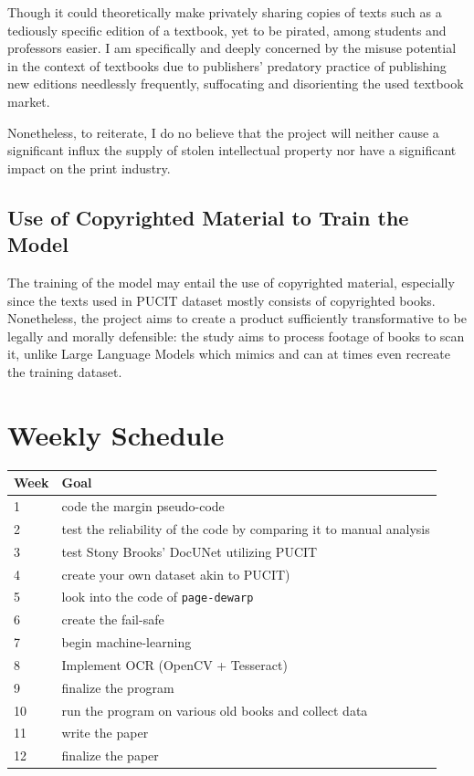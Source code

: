 \documentclass[10pt,twocolumn]{article}
\begin{document}
Though it could theoretically make privately sharing copies of texts such as a tediously specific edition of a textbook, yet to be pirated, among students and professors easier. I am specifically and deeply concerned by the misuse potential in the context of textbooks due to publishers' predatory practice of publishing new editions needlessly frequently, suffocating and disorienting the used textbook market. \newline

Nonetheless, to reiterate, I do no believe that the project will neither cause a significant influx the supply of stolen intellectual property nor have a significant impact on the print industry.  \newline

\subsection{Use of Copyrighted Material to Train the Model}
The training of the model may entail the use of copyrighted material, especially since the texts used in PUCIT dataset mostly consists of copyrighted books. Nonetheless, the project aims to create a product sufficiently transformative to be legally and morally defensible: the study aims to process footage of books to scan it, unlike Large Language Models which mimics and can at times even recreate the training dataset.\newline

\section{Weekly Schedule}
\begin{tabular}{ |p{0.8cm}|p{5cm}| }
\hline
Week & Goal \\
\hline
\rowcolor{gray!10} 1 & code the margin pseudo-code\\
2 & test the reliability of the code by comparing it to manual analysis\\
3 & test Stony Brooks' DocUNet utilizing PUCIT\\
4 & create your own dataset akin to PUCIT)\\
5 & look into the code of \texttt{page-dewarp}\\
6 & create the fail-safe\\
7 & begin machine-learning\\
8 & Implement OCR (OpenCV + Tesseract)\\
9 & finalize the program\\
10 & run the program on various old books and collect data\\
11 & write the paper\\
12 & finalize the paper\\

\hline
\end{tabular}
  
\printbibliography
\end{document}
